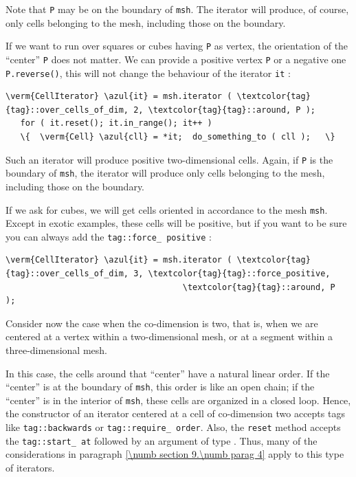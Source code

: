Note that {\small\tt P} may be on the boundary of {\small\tt msh}.
The iterator will produce, of course, only cells belonging to the mesh, including those
on the boundary.

If we want to run over squares or cubes having {\small\tt P} as vertex,
the orientation of the ``center'' {\small\tt P} does not matter.
We can provide a positive vertex {\small\tt P} or a negative one {\small\tt P.reverse()},
this will not change the behaviour of the iterator {\small\tt it} :

\begin{Verbatim}[commandchars=\\\{\},formatcom=\small\tt,
   baselinestretch=0.94,framesep=2mm                      ]
   \verm{CellIterator} \azul{it} = msh.iterator ( \textcolor{tag}{tag}::over_cells_of_dim, 2, \textcolor{tag}{tag}::around, P );
   for ( it.reset(); it.in_range(); it++ )
   \{  \verm{Cell} \azul{cll} = *it;  do_something_to ( cll );   \}
\end{Verbatim}

Such an iterator will produce positive two-dimensional cells.
Again, if {\small\tt P} is the boundary of {\small\tt msh}, the iterator will produce
only cells belonging to the mesh, including those on the boundary.

If we ask for cubes, we will get cells oriented in accordance to the mesh {\small\tt msh}.
Except in exotic examples, these cells will be positive, but if you want to be sure you
can always add the {\small\tt\textcolor{tag}{tag}::force\_\,positive} :

\begin{Verbatim}[commandchars=\\\{\},formatcom=\small\tt,
   baselinestretch=0.94,framesep=2mm                      ]
   \verm{CellIterator} \azul{it} = msh.iterator ( \textcolor{tag}{tag}::over_cells_of_dim, 3, \textcolor{tag}{tag}::force_positive,
                                    \textcolor{tag}{tag}::around, P                                 );
\end{Verbatim}

Consider now the case when the co-dimension is two, that is, when we are centered at a vertex
within a two-dimensional mesh, or at a segment within a three-dimensional mesh.

In this case, the cells around that ``center'' have a natural linear order.
If the ``center'' is at the boundary of {\small\tt msh}, this order is like an
open chain; if the ``center'' is in the interior of {\small\tt msh}, these cells
are organized in a closed loop.
Hence, the constructor of an iterator centered at a cell of co-dimension two accepts
tags like {\small\tt\textcolor{tag}{tag}::backwards} or {\small\tt\textcolor{tag}{tag}::require\_\,order}.
Also, the {\small\tt reset} method accepts the {\small\tt\textcolor{tag}{tag}::start\_\,at} followed
by an argument of type {\small\tt{}}.
Thus, many of the considerations in paragraph \ref{\numb section 9.\numb parag 4}
apply to this type of iterators.

